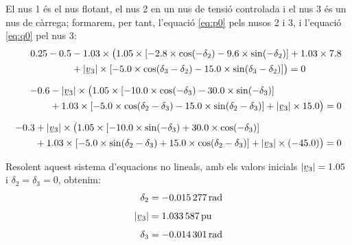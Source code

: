 \begin{exemple}
    El nus 1 és el nus flotant, el nus 2 en un nus de tensió controlada
    i el nus 3 és un nus de càrrega; formarem, per tant, l'equació
    \eqref{eq:p0} pels nusos 2 i 3, i l'equació \eqref{eq:q0} pel nus 3:
    \begin{align*}
    \begin{split}
    \num{0,25}-\num{0,5} &- \num{1,03}\times \bigl( \num{1,05}\times [\num{-2,8}
    \times\cos(-\delta_2) - \num{9,6}
    \times\sin( -\delta_2)]  + \num{1,03} \times \num{7,8} \\
    &+ |\cmplx{v}_3|\times [\num{-5,0} \times\cos(\delta_3-\delta_2) -
    \num{15,0}\times \sin(\delta_3-\delta_2)]
     \bigr)  = 0 \end{split} \\[1.5ex]
    \begin{split}
    \num{-0,6} &- |\cmplx{v}_3| \times \bigl( \num{1,05}\times [-\num{10,0}
    \times\cos(-\delta_3)
    - \num{30,0}\times\sin(-\delta_3)]  \\
    &+ \num{1,03}\times [-\num{5,0}\times\cos(\delta_2-\delta_3) -
    \num{15,0}\times\sin(\delta_2-\delta_3)]
     + |\cmplx{v}_3| \times \num{15,0} \bigr)  = 0 \end{split}  \\[1.5ex]
    \begin{split}
    -\num{0,3} &+ |\cmplx{v}_3|\times \bigl( \num{1,05}
    \times[-\num{10,0}\times\sin(-\delta_3) +
    \num{30,0}\times\cos(-\delta_3)]  \\
    &+ \num{1,03} \times[-\num{5,0}\times\sin(\delta_2-\delta_3) +
    \num{15,0}\times\cos(\delta_2-\delta_3)] + |\cmplx{v}_3|\times (\num{-45,0})
    \bigr)  = 0 \end{split}
    \end{align*}

    Resolent aquest sistema d'equacions no lineals, amb els valors
    inicials $|\cmplx{v}_3|=\num{1,05}$ i $\delta_2=\delta_3=0$, obtenim:
    \begin{align*}
       \delta_2 &= \qty{-0,015277}{rad} \\[1ex]
       |\cmplx{v}_3| &= \qty{1,033587}{pu} \\[1ex]
        \delta_3 &= \qty{-0,014301}{rad}
    \end{align*}


\end{exemple}
